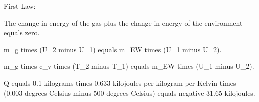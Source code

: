 First Law:

The change in energy of the gas plus the change in energy of the environment equals zero.

m_g times (U_2 minus U_1) equals m_EW times (U_1 minus U_2).

m_g times c_v times (T_2 minus T_1) equals m_EW times (U_1 minus U_2).

Q equals 0.1 kilograms times 0.633 kilojoules per kilogram per Kelvin times (0.003 degrees Celsius minus 500 degrees Celsius) equals negative 31.65 kilojoules.